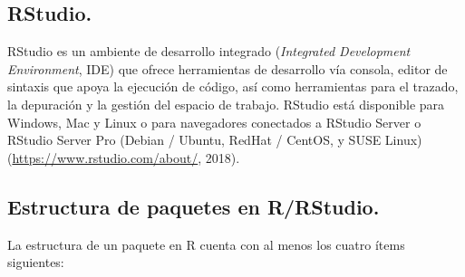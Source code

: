 \subsection{RStudio.}

RStudio es un ambiente de desarrollo integrado (\textit{Integrated Development Environment}, IDE) que ofrece herramientas de desarrollo vía consola, editor de sintaxis que apoya la ejecución de código, así como herramientas para el trazado, la depuración y la gestión del espacio de trabajo.  RStudio está disponible para Windows, Mac y Linux o para navegadores conectados a RStudio Server o RStudio Server Pro (Debian / Ubuntu, RedHat / CentOS, y SUSE Linux) (\url{https://www.rstudio.com/about/}, 2018).
 

\subsection{Estructura de paquetes en R/RStudio.}

La estructura de un paquete en R cuenta con al menos los cuatro \'items siguientes:

